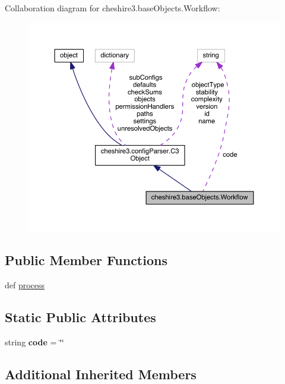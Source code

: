 Collaboration diagram for cheshire3.\-base\-Objects.\-Workflow\-:
\nopagebreak
\begin{figure}[H]
\begin{center}
\leavevmode
\includegraphics[width=350pt]{classcheshire3_1_1base_objects_1_1_workflow__coll__graph}
\end{center}
\end{figure}
\subsection*{Public Member Functions}
\begin{DoxyCompactItemize}
\item 
def \hyperlink{classcheshire3_1_1base_objects_1_1_workflow_a57abb5132e6df3e7b5e59929a1feb6ee}{process}
\end{DoxyCompactItemize}
\subsection*{Static Public Attributes}
\begin{DoxyCompactItemize}
\item 
\hypertarget{classcheshire3_1_1base_objects_1_1_workflow_a552240c8b71c916b8e6f9ba15e0de097}{string {\bfseries code} = \char`\"{}\char`\"{}}\label{classcheshire3_1_1base_objects_1_1_workflow_a552240c8b71c916b8e6f9ba15e0de097}

\end{DoxyCompactItemize}
\subsection*{Additional Inherited Members}


